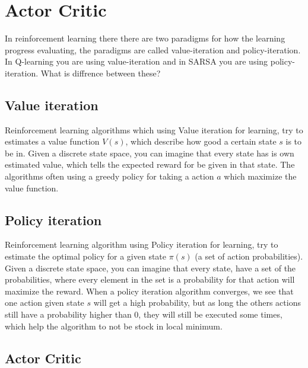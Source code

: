\documentclass[11pt]{article}
\begin{document}
\maketitle

\section{Actor Critic}

In reinforcement learning there there are two paradigms for how the learning progress evaluating, the paradigms are called value-iteration and policy-iteration. In Q-learning you are using value-iteration and in SARSA you are using policy-iteration. What is diffrence between these?

\subsection{Value iteration}

Reinforcement learning algorithms which using Value iteration for learning, try to estimates a value function $V(s)$, which describe how good a certain state $s$ is to be in. Given a discrete state space, you can imagine that every state has is own estimated value, which tells the expected reward for be given in that state. The algorithms often using a greedy policy for taking a action $a$ which maximize the value function. 

\subsection{Policy iteration}


Reinforcement learning algorithm using Policy iteration for learning, try to estimate the optimal policy for a given state $\pi(s)$ (a set of action probabilities). Given a discrete state space, you can imagine that every state, have a set of the probabilities, where every element in the set is a probability for that action will maximize the reward. When a policy iteration algorithm converges, we see that one action given state $s$ will get a high probability, but as long the others actions still have a probability higher than 0, they will still be executed some times, which help the algorithm to not be stock in local minimum.

\subsection{Actor Critic}
\end{document}
